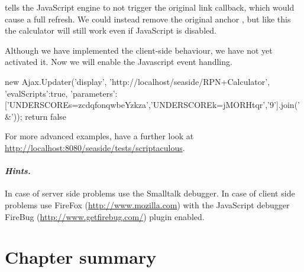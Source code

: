 \documentclass[a4paper,10pt,twoside]{book}
\begin{document}
 tells the JavaScript engine to not trigger the original link callback, which would cause a full refresh.
We could instead remove the original anchor , but like this the calculator will still work even if JavaScript is disabled.


Although we have implemented the client-side behaviour, we have not yet activated it.
Now we will enable the Javascript event handling.


\begin{code}{}
new Ajax.Updater('display', 'http://localhost/seaside/RPN+Calculator', {'evalScripts':true, 'parameters':['UNDERSCOREs=zcdqfonqwbeYzkza','UNDERSCOREk=jMORHtqr','9'].join('&')}); return false
\end{code}

For more advanced examples, have a further look at \url{http://localhost:8080/seaside/tests/scriptaculous}.

\paragraph{\emph{Hints.}}
In case of server side problems use the Smalltalk debugger.
In case of client side problems use FireFox (\url{http://www.mozilla.com}) with the JavaScript debugger FireBug (\url{http://www.getfirebug.com/}) plugin enabled.

\section{Chapter summary}
\end{document}
